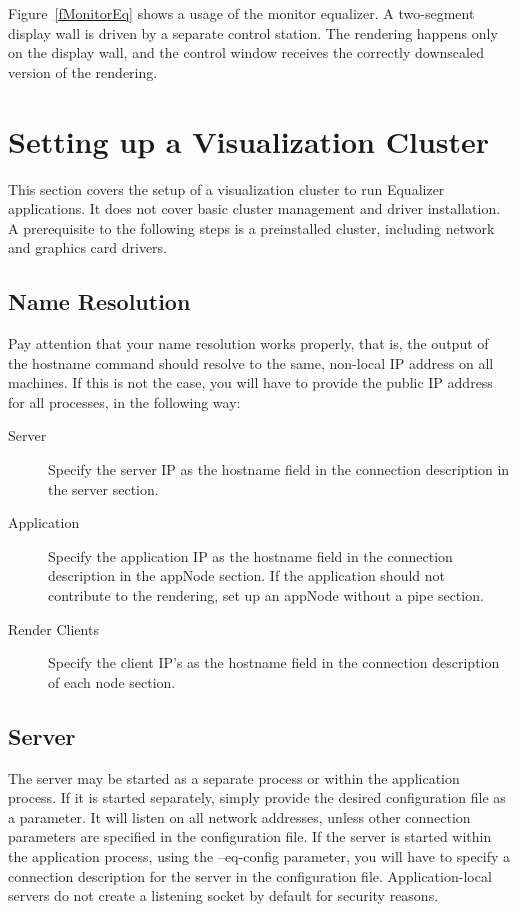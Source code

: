 \documentclass[10pt,a4]{scrartcl}
\newcommand{\fig}[1]{Figure~\ref{#1}}
\begin{document}
\fig{fMonitorEq} shows a usage of the monitor equalizer. A two-segment
display wall is driven by a separate control station. The rendering
happens only on the display wall, and the control window receives the
correctly downscaled version of the rendering.


\section{\label{sClusterSetup}Setting up a Visualization Cluster}
This section covers the setup of a visualization cluster to run Equalizer
applications. It does not cover basic cluster management and driver
installation. A prerequisite to the following steps is a preinstalled cluster,
including network and graphics card drivers.

\subsection{Name Resolution}
Pay attention that your name resolution works properly, that is, the output of
the hostname command should resolve to the same, non-local IP address on all
machines. If this is not the case, you will have to provide the public IP
address for all processes, in the following way:
\begin{description}
\item[Server] Specify the server IP as the hostname field in the connection
  description in the server section.
\item[Application] Specify the application IP as the hostname field in the
  connection description in the appNode section. If the application should not
  contribute to the rendering, set up an appNode without a pipe section.
\item[Render Clients] Specify the client IP's as the hostname field in the
  connection description of each node section.
\end{description}

\subsection{Server}
The server may be started as a separate process or within the application
process. If it is started separately, simply provide the desired configuration
file as a parameter. It will listen on all network addresses, unless other
connection parameters are specified in the configuration file. If the
server is started within the application process, using the \textsf{--eq-config}
parameter, you will have to specify a connection description for the server in
the configuration file. Application-local servers do not create a listening
socket by default for security reasons.
\end{document}
